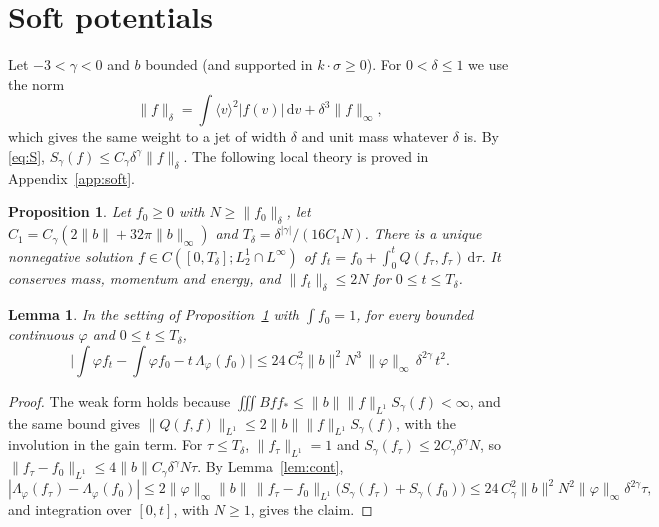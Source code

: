 \documentclass[11pt]{amsart}
\newtheorem{proposition}[theorem]{Proposition}
\newtheorem{lemma}[theorem]{Lemma}
\theoremstyle{definition}
\newcommand{\dd}{\,\mathrm{d}}
\newcommand{\jb}[1]{\langle #1\rangle}
\newcommand{\nb}{\|b\|}
\newcommand{\nbi}{\|b\|_\infty}
\begin{document}
\section{Soft potentials}\label{sec:soft}

Let $-3<\gamma<0$ and $b$ bounded (and supported in $k\cdot\sigma\ge0$). For $0<\delta\le1$ we use the norm
\begin{equation}\label{eq:norm}
\|f\|_\delta=\int\jb{v}^2|f(v)|\dd v+\delta^3\|f\|_\infty ,
\end{equation}
which gives the same weight to a jet of width $\delta$ and unit mass whatever $\delta$ is. By \eqref{eq:S}, $S_\gamma(f)\le C_\gamma\delta^\gamma\|f\|_\delta$. The following local theory is proved in Appendix~\ref{app:soft}.

\begin{proposition}\label{prop:local}
Let $f_0\ge0$ with $N\ge\|f_0\|_\delta$, let $C_1=C_\gamma(2\nb+32\pi\nbi)$ and $T_\delta=\delta^{|\gamma|}/(16C_1N)$. There is a unique nonnegative solution $f\in C([0,T_\delta];L^1_2\cap L^\infty)$ of $f_t=f_0+\int_0^tQ(f_\tau,f_\tau)\dd\tau$. It conserves mass, momentum and energy, and $\|f_t\|_\delta\le2N$ for $0\le t\le T_\delta$.
\end{proposition}

\begin{lemma}\label{lem:expsoft}
In the setting of Proposition~\ref{prop:local} with $\int f_0=1$, for every bounded continuous $\varphi$ and $0\le t\le T_\delta$,
\[
\Big|\int\varphi f_t-\int\varphi f_0-t\,\Lambda_\varphi(f_0)\Big|\le 24\,C_\gamma^2\nb^2N^3\,\|\varphi\|_\infty\,\delta^{2\gamma}\,t^2 .
\]
\end{lemma}

\begin{proof}
The weak form holds because $\iiint B ff_*\le\nb\|f\|_{L^1}S_\gamma(f)<\infty$, and the same bound gives $\|Q(f,f)\|_{L^1}\le2\nb\|f\|_{L^1}S_\gamma(f)$, with the involution in the gain term. For $\tau\le T_\delta$, $\|f_\tau\|_{L^1}=1$ and $S_\gamma(f_\tau)\le2C_\gamma\delta^\gamma N$, so $\|f_\tau-f_0\|_{L^1}\le4\nb C_\gamma\delta^\gamma N\tau$. By Lemma~\ref{lem:cont},
\[
|\Lambda_\varphi(f_\tau)-\Lambda_\varphi(f_0)|\le2\|\varphi\|_\infty\nb\,\|f_\tau-f_0\|_{L^1}\big(S_\gamma(f_\tau)+S_\gamma(f_0)\big)\le24\,C_\gamma^2\nb^2N^2\|\varphi\|_\infty\delta^{2\gamma}\tau,
\]
and integration over $[0,t]$, with $N\ge1$, gives the claim.
\end{proof}
\end{document}
